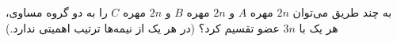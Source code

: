 \EXERCISE
به چند طریق می‌توان
$2n$
مهره
$A$
و
$2n$
مهره
$B$
و
$2n$
مهره
$C$
را به دو گروه مساوی، هر یک با
$3n$
عضو تقسیم کرد؟ (در هر یک از نیمه‌ها ترتیب اهمیتی ندارد.)